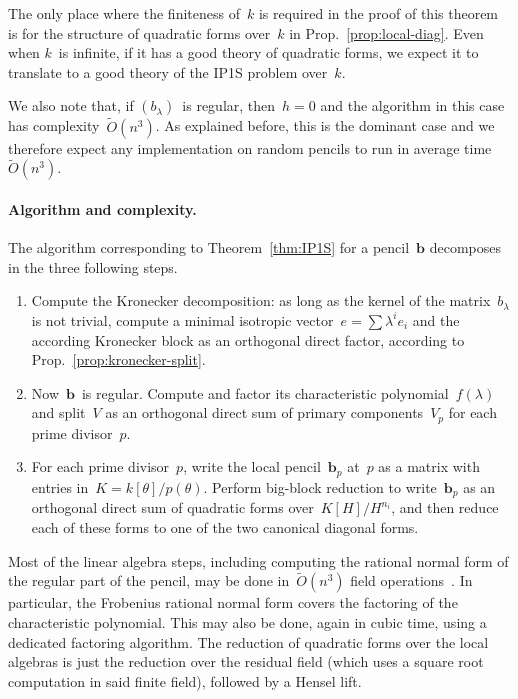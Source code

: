 \documentclass{article}%
\def\Ot{\widetilde{O}}
\begin{document}
The only place where the finiteness of~$k$ is required in the proof of
this theorem is for the structure of quadratic forms over~$k$ in
Prop.~\ref{prop:local-diag}. Even when $k$~is infinite, if it has a good
theory of quadratic forms, we expect it to translate to a good theory of
the IP1S problem over~$k$.

We also note that, if $(b_{λ})$~is regular,
then~$h = 0$ and the algorithm in this case has complexity~$\Ot(n^3)$. As
explained before, this is the dominant case and we therefore expect any
implementation on random pencils to run in average time~$\Ot(n^3)$.

\paragraph{Algorithm and complexity.}

The algorithm corresponding to Theorem~\ref{thm:IP1S} for a
pencil~$\bm{b}$ decomposes in the three following steps.

\begin{enumerate}
\item \label{it:alg-kronecker} Compute the Kronecker decomposition: as
long as the kernel of the matrix~$b_{λ}$ is not trivial, compute a
minimal isotropic vector~$e = ∑ λ^i e_i$ and the according Kronecker
block as an orthogonal direct factor, according to
Prop.~\ref{prop:kronecker-split}.
\item \label{it:alg-factor} Now~$\bm{b}$~is regular. Compute and factor
its characteristic polynomial~$f(λ)$ and split~$V$ as an orthogonal direct
sum of primary components~$V_p$ for each prime divisor~$p$.
\item \label{it:alg-local} For each prime divisor~$p$, write the local
pencil~$\bm{b}_p$ at~$p$ as a matrix with entries in~$K = k[θ]/p(θ)$.
Perform big-block reduction to write~$\bm{b}_p$ as an orthogonal direct
sum of quadratic forms over~$K[H]/H^{n_i}$, and then reduce
each of these forms to one of the two canonical diagonal forms.
\end{enumerate}

Most of the linear algebra steps, including computing the
rational normal form of the regular part of the pencil, may be done
in~$\Ot(n^3)$ field operations~\cite{kaltoffen11compute}. In particular,
the Frobenius rational normal form covers the factoring of the
characteristic polynomial. This may also be done, again in cubic time,
using a dedicated factoring algorithm. The reduction of quadratic forms
over the local algebras is just the reduction over the residual field
(which uses a square root computation in said finite field), followed by
a Hensel lift.
\end{document}
